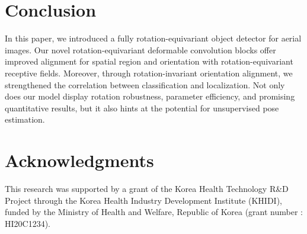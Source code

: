 \documentclass[letterpaper]{article} %
\begin{document}
\section{Conclusion}
In this paper, we introduced a fully rotation-equivariant object detector for aerial images. Our novel rotation-equivariant deformable convolution blocks offer improved alignment for spatial region and orientation with rotation-equivariant receptive fields. Moreover, through rotation-invariant orientation alignment, we strengthened the correlation between classification and localization. Not only does our model display rotation robustness, parameter efficiency, and promising quantitative results, but it also hints at the potential for unsupervised pose estimation.

\section{Acknowledgments}
This research was supported by a grant of the Korea Health Technology R\&D Project through the Korea Health Industry Development Institute (KHIDI), funded by the Ministry of Health and Welfare, Republic of Korea (grant number : HI20C1234).



\appendix



\end{document}
